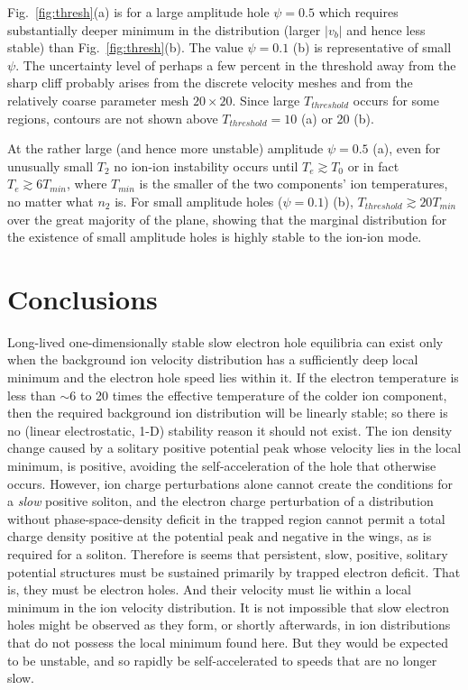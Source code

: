 \documentclass[pre]{revtex4-2}
\begin{document}
Fig.\ \ref{fig:thresh}(a) is for a large amplitude hole $\psi=0.5$
which requires substantially deeper minimum in the distribution
(larger $|v_b|$ and hence less stable) than Fig.\
\ref{fig:thresh}(b). The value $\psi=0.1$ (b) is representative of
small $\psi$. The uncertainty level of perhaps a few percent in the
threshold away from the sharp cliff probably arises from the discrete
velocity meshes and from the relatively coarse parameter mesh
$20\times 20$.  Since large $T_{threshold}$ occurs for some regions,
contours are not shown above $T_{threshold}=10$ (a) or 20 (b).

At the rather large (and hence more
unstable) amplitude $\psi=0.5$ (a), even for unusually small $T_2$ no
ion-ion instability occurs until $T_e\gtrsim T_0$ or in fact
$T_e\gtrsim 6 T_{min}$, where $T_{min}$ is the smaller of the two
components' ion temperatures, no matter what $n_2$ is. For small
amplitude holes ($\psi=0.1$) (b), $T_{threshold}\gtrsim 20 T_{min}$
over the great majority of the plane, showing that the marginal
distribution for the existence of small amplitude holes is highly
stable to the ion-ion mode.

\section{Conclusions}

Long-lived one-dimensionally stable slow electron hole equilibria can
exist only when the background ion velocity distribution has a
sufficiently deep local minimum and the electron hole speed lies
within it. If the electron temperature is less than $\sim 6$ to 20
times the effective temperature of the colder ion component, then the
required background ion distribution will be linearly stable; so there
is no (linear electrostatic, 1-D) stability reason it should not
exist. The ion density change caused by a solitary positive potential
peak whose velocity lies in the local minimum, is positive, avoiding
the self-acceleration of the hole that otherwise occurs. However, ion
charge perturbations alone cannot create the conditions for a
\emph{slow} positive soliton, and the electron charge perturbation of
a distribution without phase-space-density deficit in the trapped
region cannot permit a total charge density positive at the potential
peak and negative in the wings, as is required for a
soliton. Therefore is seems that persistent, slow, positive, solitary
potential structures must be sustained primarily by trapped electron
deficit. That is, they must be electron holes. And their velocity must
lie within a local minimum in the ion velocity distribution. It is not
impossible that slow electron holes might be observed as they form, or
shortly afterwards, in ion distributions that do not possess the local
minimum found here. But they would be expected to be unstable, and so
rapidly be self-accelerated to speeds that are no longer slow.
\end{document}
